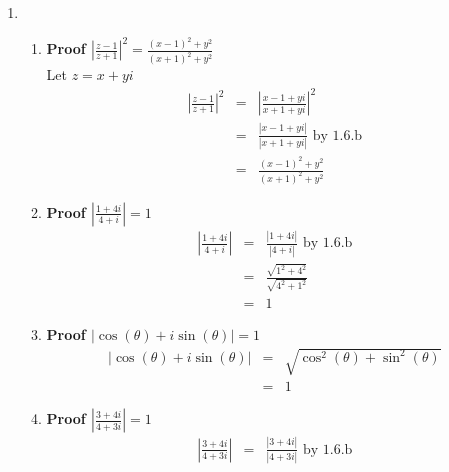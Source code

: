 \documentclass{article}%
\newcommand\abs[1]{\left|#1\right|}
\newenvironment{proof}[1][]{\begin{samepage}\textbf{Proof #1} }{\end{samepage}}
\begin{document}
\begin{enumerate}
\begin{enumerate}[label*=\arabic*.]
\begin{enumerate}[label=\alph*]
        \end{enumerate}
        \item %
        \begin{enumerate}[label=\alph*]
            \item %
            \begin{proof}[$\abs{\frac{z-1}{z+1}}^2=\frac{(x-1)^2+y^2}{(x+1)^2+y^2}$]
                \\ Let $z=x+yi$
                \begin{eqnarray*}
                    \abs{\frac{z-1}{z+1}}^2&=&\abs{\frac{x-1+yi}{x+1+yi}}^2 \\
                                           &=&\frac{\abs{x-1+yi}}{\abs{x+1+yi}} \text{ by 1.6.b} \\
                                           &=&\frac{(x-1)^2+y^2}{(x+1)^2+y^2}
                \end{eqnarray*}
            \end{proof}
            \item %
            \begin{proof}[$\abs{\frac{1+4i}{4+i}}=1$]
                \begin{eqnarray*}
                    \abs{\frac{1+4i}{4+i}}&=&\frac{\abs{1+4i}}{\abs{4+i}} \text{ by 1.6.b} \\
                                          &=&\frac{\sqrt{1^2+4^2}}{\sqrt{4^2+1^2}} \\
                                          &=&1
                \end{eqnarray*}
            \end{proof}
            \item %
            \begin{proof}[$\abs{\cos(\theta)+i \sin(\theta)}=1$]
                \begin{eqnarray*}
                    \abs{\cos(\theta)+i \sin(\theta)}&=&\sqrt{\cos^2(\theta)+\sin^2(\theta)} \\
                                                     &=&1
                \end{eqnarray*}
            \end{proof}
            \item %
            \begin{proof}[$\abs{\frac{3+4i}{4+3i}}=1$]
                \begin{eqnarray*}
                    \abs{\frac{3+4i}{4+3i}}&=&\frac{\abs{3+4i}}{\abs{4+3i}} \text{ by 1.6.b} \\

\end{eqnarray*}
\end{proof}
\end{enumerate}
\end{enumerate}
\end{enumerate}
\end{document}
